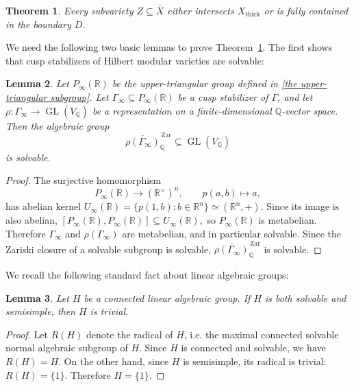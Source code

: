 \documentclass[12 pt]{amsart}
\newtheorem{theorem}{Theorem}[section]
\newtheorem{Lemma}[theorem]{Lemma}
\theoremstyle{definition}
\begin{document}
 
\begin{theorem}\label{alg thick} Every subvariety
$Z\subseteq\overline X$ either intersects $X_{\mathrm{thick}}$ or is fully contained in the boundary $D$. 

\end{theorem}

We need the following two basic lemmas to prove Theorem~\ref{alg thick}. The first shows that cusp stabilizers of Hilbert modular varieties are solvable:
\begin{Lemma}\label{Metabelain} Let $P_\infty(\mathbb R)$ be the upper-triangular group defined in \eqref{the upper-triangular subgroup}.
Let $\Gamma_\infty\subseteq P_\infty(\mathbb R)$ be a cusp
stabilizer of $\Gamma$, and let
$\rho:\Gamma_\infty\to\operatorname{GL}(V_{\mathbb Q})$
be a representation on a finite-dimensional $\mathbb Q$-vector space.
Then the algebraic group
\[
\overline{\rho(\Gamma_\infty)}^{\,\mathrm{Zar}}_{\mathbb Q}
\subseteq\operatorname{GL}(V_{\mathbb Q})
\]
is solvable.
\end{Lemma}

\begin{proof}
The surjective homomorphism
\[
P_\infty(\mathbb R)\longrightarrow(\mathbb R^\times)^n,\qquad
p(a,b)\longmapsto a,
\]
has abelian kernel
\(
U_\infty(\mathbb R)
=
\{p(1,b):b\in\mathbb R^n\}
\simeq(\mathbb R^n,+).
\)
Since its image is also abelian,
\(
[P_\infty(\mathbb R),P_\infty(\mathbb R)]
\subseteq U_\infty(\mathbb R),
\)
so $P_\infty(\mathbb R)$ is metabelian. Therefore
$\Gamma_\infty$ and $\rho(\Gamma_\infty)$ are metabelian,
and in particular solvable. Since the Zariski closure of a
solvable subgroup is solvable, $\overline{\rho(\Gamma_\infty)}^{\,\mathrm{Zar}}_{\mathbb Q}$ is solvable.
\end{proof}



We recall the following standard fact about linear algebraic groups:
\begin{Lemma}\label{semisimple-solvable}
Let $ H$ be a connected linear algebraic group. If $H$ is both
solvable and semisimple, then $ H$ is trivial.
\end{Lemma}

\begin{proof}
Let $R(H)$ denote the radical of $H$, i.e. the maximal connected
solvable normal algebraic subgroup of $ H$. Since $H$ is connected
and solvable, we have
\(
R(H)= H.
\)
On the other hand, since $ H$ is semisimple, its radical is trivial:
\(
R( H)=\{1\}.
\)
Therefore $H=\{1\}$.
\end{proof}
\end{document}
